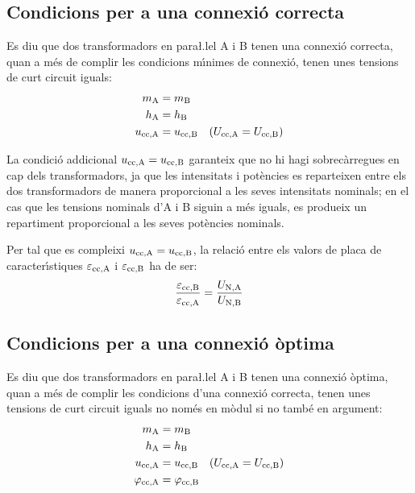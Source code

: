 \subsection{Condicions per a una connexi\'{o} correcta}
 Es diu que dos transformadors en para{\l.l}el  A i B tenen una connexi\'{o} correcta, quan a m\'{e}s de complir les condicions m\'{\i}nimes de connexi\'{o}, tenen unes tensions de curt circuit iguals:
\begin{align}
    m_\mathrm{A} &= m_\mathrm{B}\\
    h_\mathrm{A} &= h_\mathrm{B}\\
    u_\mathrm{cc,A} &= u_\mathrm{cc,B} \quad (U_\mathrm{cc,A} = U_\mathrm{cc,B})
\end{align}

La condici\'{o} addicional  $u_\mathrm{cc,A} = u_\mathrm{cc,B}$ garanteix que no hi hagi sobrec\`{a}rregues en cap dels transformadors, ja que les intensitats i pot\`{e}ncies es reparteixen entre els dos transformadors de manera proporcional a les seves intensitats nominals; en el cas que les tensions nominals d'A i B siguin a m\'{e}s iguals, es produeix un repartiment proporcional a les seves pot\`{e}ncies nominals.

Per tal que es compleixi $u_\mathrm{cc,A} = u_\mathrm{cc,B}$, la relaci\'{o} entre els valors de placa de caracter\'{\i}stiques $\varepsilon_\mathrm{cc,A}$ i $\varepsilon_\mathrm{cc,B}$ ha de ser:
\begin{equation}
    \frac{\varepsilon_\mathrm{cc,B}}{\varepsilon_\mathrm{cc,A}} = \frac{U_\mathrm{N,A}}{U_\mathrm{N,B}}
\end{equation}

\subsection{Condicions per a una connexi\'{o} \`{o}ptima}

 Es diu que dos transformadors en para{\l.l}el A i B tenen una connexi\'{o} \`{o}ptima, quan a m\'{e}s de complir les condicions d'una connexi\'{o} correcta, tenen unes tensions de curt circuit iguals no nom\'{e}s en m\`{o}dul si no tamb\'{e} en argument:
\begin{align}
    m_\mathrm{A} &= m_\mathrm{B}\\
    h_\mathrm{A} &= h_\mathrm{B}\\
    u_\mathrm{cc,A} &= u_\mathrm{cc,B} \quad (U_\mathrm{cc,A} = U_\mathrm{cc,B})\\
    \varphi_\mathrm{cc,A} &=\varphi_\mathrm{cc,B}
\end{align}

